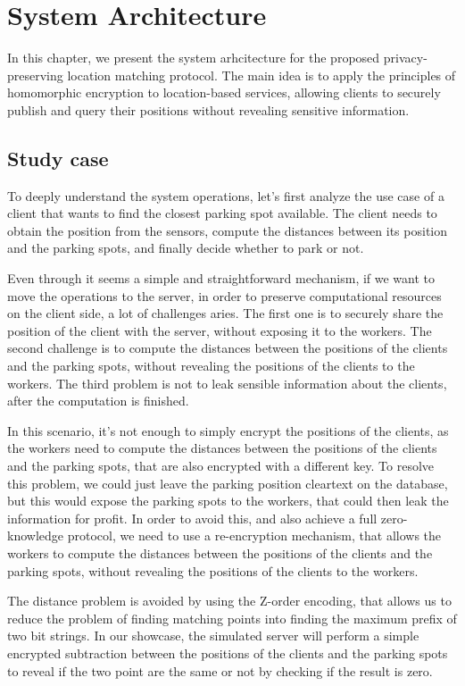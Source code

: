 \documentclass[12pt,a4paper,twoside]{book}
\begin{document}
\chapter{System Architecture}
In this chapter, we present the system arhcitecture for the proposed privacy-preserving location matching protocol. The main idea is to apply the principles of homomorphic encryption to location-based services, allowing clients to securely publish and query their positions without revealing sensitive information.

\section{Study case}
To deeply understand the system operations, let's first analyze the use case of a client that wants to find the closest parking spot available. The client needs to obtain the position from the sensors, compute the distances between its position and the parking spots, and finally decide whether to park or not.

Even through it seems a simple and straightforward mechanism, if we want to move the operations to the server, in order to preserve computational resources on the client side, a lot of challenges aries. The first one is to securely share the position of the client with the server, without exposing it to the workers. The second challenge is to compute the distances between the positions of the clients and the parking spots, without revealing the positions of the clients to the workers. The third problem is not to leak sensible information about the clients, after the computation is finished.

In this scenario, it's not enough to simply encrypt the positions of the clients, as the workers need to compute the distances between the positions of the clients and the parking spots, that are also encrypted with a different key. To resolve this problem, we could just leave the parking position cleartext on the database, but this would expose the parking spots to the workers, that could then leak the information for profit. In order to avoid this, and also achieve a full zero-knowledge protocol, we need to use a re-encryption mechanism, that allows the workers to compute the distances between the positions of the clients and the parking spots, without revealing the positions of the clients to the workers.

The distance problem is avoided by using the Z-order encoding, that allows us to reduce the problem of finding matching points into finding the maximum prefix of two bit strings. In our showcase, the simulated server will perform a simple encrypted subtraction between the positions of the clients and the parking spots to reveal if the two point are the same or not by checking if the result is zero. 
\end{document}
